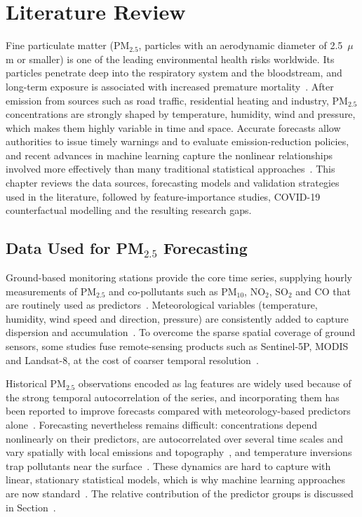 \chapter{Literature Review}
\label{chapter:Literature Review}
Fine particulate matter (PM$_{2.5}$, particles with an aerodynamic diameter of 2.5~$\mu$m or smaller) is one of the leading environmental health risks worldwide. Its particles penetrate deep into the respiratory system and the bloodstream, and long-term exposure is associated with increased premature mortality~\parencite{vodonos2018, who2021}. After emission from sources such as road traffic, residential heating and industry, PM$_{2.5}$ concentrations are strongly shaped by temperature, humidity, wind and pressure, which makes them highly variable in time and space. Accurate forecasts allow authorities to issue timely warnings and to evaluate emission-reduction policies, and recent advances in machine learning capture the nonlinear relationships involved more effectively than many traditional statistical approaches~\parencite{wu2025}. This chapter reviews the data sources, forecasting models and validation strategies used in the literature, followed by feature-importance studies, COVID-19 counterfactual modelling and the resulting research gaps.

\section{Data Used for PM$_{2.5}$ Forecasting}
\label{section:Data Used for PM$_{2.5}$ Forecasting}
Ground-based monitoring stations provide the core time series, supplying hourly measurements of PM$_{2.5}$ and co-pollutants such as PM$_{10}$, NO$_2$, SO$_2$ and CO that are routinely used as predictors~\parencite{ozupak2025, lilhore2025}. Meteorological variables (temperature, humidity, wind speed and direction, pressure) are consistently added to capture dispersion and accumulation~\parencite{tirinck2025, lilhore2025, zeng2026}. To overcome the sparse spatial coverage of ground sensors, some studies fuse remote-sensing products such as Sentinel-5P, MODIS and Landsat-8, at the cost of coarser temporal resolution~\parencite{kalaiselvi2025}.

Historical PM$_{2.5}$ observations encoded as lag features are widely used because of the strong temporal autocorrelation of the series, and incorporating them has been reported to improve forecasts compared with meteorology-based predictors alone~\parencite{kang2023}. Forecasting nevertheless remains difficult: concentrations depend nonlinearly on their predictors, are autocorrelated over several time scales and vary spatially with local emissions and topography~\parencite{wu2025}, and temperature inversions trap pollutants near the surface~\parencite{zeng2026}. These dynamics are hard to capture with linear, stationary statistical models, which is why machine learning approaches are now standard~\parencite{wu2025, singh2026}. The relative contribution of the predictor groups is discussed in Section~.

